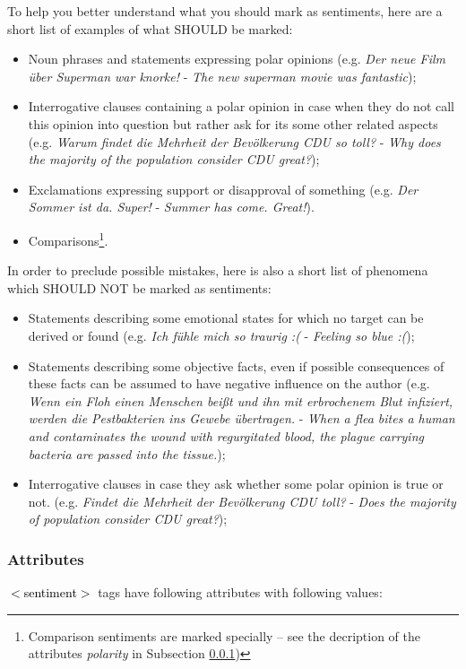 \documentclass[11pt,a4paper]{article}
\newcommand{\xmltag}[1]{\textcolor{black}{{\small$<$#1$>$}}}
\begin{document}
To help you better understand what you should mark as sentiments, here
are a short list of examples of what SHOULD be marked:
\begin{itemize}
  \item Noun phrases and statements expressing polar opinions
    (e.g. \textit{Der neue Film \"uber Superman war knorke!} -
    \textit{The new superman movie was fantastic});
  \item Interrogative clauses containing a polar opinion in case when
    they do not call this opinion into question but rather ask for its
    some other related aspects (e.g. \textit{Warum findet die Mehrheit
      der Bev\"olkerung CDU so toll?} - \textit{Why does the majority
      of the population consider CDU great?});
  \item Exclamations expressing support or disapproval of something
    (e.g. \textit{Der Sommer ist da. Super!} - \textit{Summer has
    come. Great!}).
  \item Comparisons\footnote{Comparison sentiments are marked
    specially -- see the decription of the attributes
    \textit{polarity} in Subsection \ref{sentiment-attribute})}.
\end{itemize}

In order to preclude possible mistakes, here is also a short list of
phenomena which SHOULD NOT be marked as sentiments:
\begin{itemize}
  \item Statements describing some emotional states for which no
    target can be derived or found (e.g. \textit{Ich f\"uhle mich so
      traurig :(} - \textit{Feeling so blue :(});
  \item Statements describing some objective facts, even if possible
    consequences of these facts can be assumed to have negative
    influence on the author (e.g. \textit{Wenn ein Floh einen Menschen
      bei\ss{}t und ihn mit erbrochenem Blut infiziert, werden die
      Pestbakterien ins Gewebe \"ubertragen.} - \textit{When a flea
      bites a human and contaminates the wound with regurgitated
      blood, the plague carrying bacteria are passed into the
      tissue.});
  \item Interrogative clauses in case they ask whether some polar
    opinion is true or not. (e.g. \textit{Findet die Mehrheit
      der Bev\"olkerung CDU toll?} - \textit{Does the majority
      of population consider CDU great?});
\end{itemize}

\subsubsection{Attributes}\label{sentiment-attribute}
\xmltag{sentiment} tags have following attributes with following
values:
\end{document}
